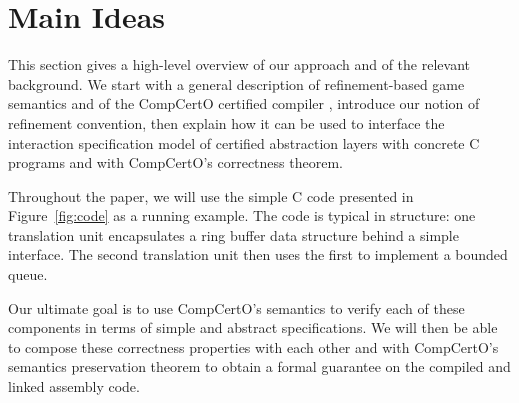 \documentclass[sigplan,10pt,authordraft]{acmart}
\begin{document}
%
%
%



\section{Main Ideas} \label{sec:mainideas} %

This section gives a high-level overview
of our approach and of the relevant background.
We start with a general description of
refinement-based game semantics \cite{rbgs-cal}
and of the CompCertO certified compiler \cite{compcerto},
introduce our notion of refinement convention,
then explain how it can be used to interface
the interaction specification model
of certified abstraction layers
with concrete C programs
and with CompCertO's correctness theorem.

Throughout the paper,
we will use the simple C code presented in Figure~\ref{fig:code}
as a running example.
The code is typical in structure:
one translation unit
encapsulates a ring buffer data structure
behind a simple interface.
The second translation unit then uses the first
to implement a bounded queue.

Our ultimate goal is to use CompCertO's semantics
to verify each of these components in terms of
simple and abstract specifications.
We will then be able to compose these correctness properties
with each other and with CompCertO's semantics preservation theorem
to obtain a formal guarantee on the compiled and linked assembly code.
\end{document}
